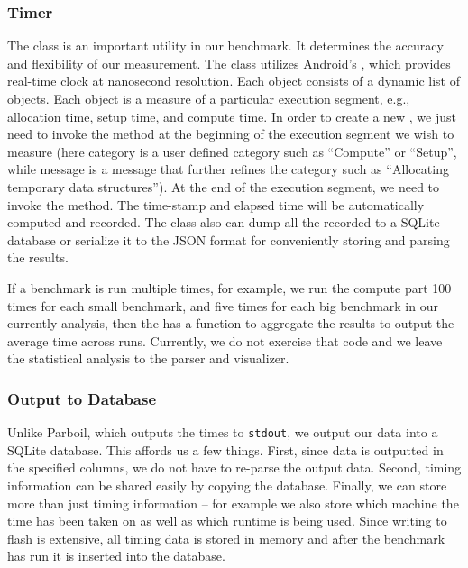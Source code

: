 \subsubsection{Timer}
The  class is an important utility in our benchmark. It
determines the accuracy and flexibility of our measurement. The 
class utilizes Android's , which provides real-time clock at
nanosecond resolution. Each  object consists of a dynamic list of
 objects. Each  object is a measure of a
particular execution segment, e.g., allocation time, setup time, and compute
time. In order to create a new , we just need to invoke the
 method at the beginning of the execution
segment we wish to measure (here category is a user defined category such as
``Compute'' or ``Setup'', while message is a message that further refines the
category such as ``Allocating temporary data structures''). At the end of the
execution segment, we need to invoke the  method. The
time-stamp and elapsed time will be automatically computed and recorded.
The  class also can dump all the recorded  to a
SQLite database or serialize it to the JSON format for conveniently storing and
parsing the results.

If a benchmark is run multiple times, for example, we run the compute part 100
times for each small benchmark, and five times for each big benchmark in our
currently analysis, then the  has a function to aggregate the results
to output the average time across runs.  Currently, we do not exercise that code
and we leave the statistical analysis to the parser and visualizer.

\subsubsection{Output to Database}

Unlike Parboil, which outputs the times to {\tt stdout}, we output our data into
a SQLite database.  This affords us a few things.  First, since data is
outputted in the specified columns, we do not have to re-parse the output data.
Second, timing information can be shared easily by copying the database.
Finally, we can store more than just timing information -- for example we also
store which machine the time has been taken on as well as which runtime is being
used.  Since writing to flash is extensive, all timing data is stored in memory
and after the benchmark has run it is inserted into the database. 


